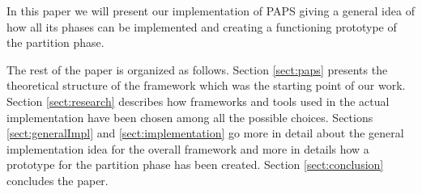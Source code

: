 In this paper we will present our implementation of PAPS giving a general idea of how all its phases can be 
implemented and creating a functioning prototype of the partition phase. 

The rest of the paper is organized as follows. Section \ref{sect:paps} presents the theoretical structure of the 
framework which was the starting point of our work. Section \ref{sect:research} describes how frameworks and tools
used in the actual implementation have been chosen among all the possible choices. Sections \ref{sect:generalImpl}
and \ref{sect:implementation} go more in detail about the general implementation idea for the overall framework and
more in details how a prototype for the partition phase has been created. Section \ref{sect:conclusion} concludes 
the paper.
